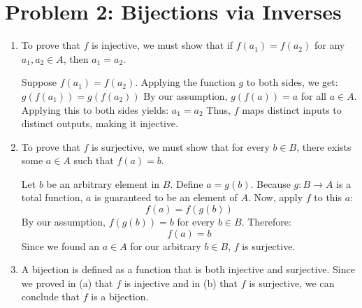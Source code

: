 \documentclass[11pt]{article}
\begin{document}
\section*{Problem 2: Bijections via Inverses}
\begin{enumerate}[label=\textbf{(\alph*)}]
    \item To prove that $f$ is injective, we must show that if $f(a_1) = f(a_2)$ for any $a_1, a_2 \in A$, then $a_1 = a_2$. 
    
    Suppose $f(a_1) = f(a_2)$. Applying the function $g$ to both sides, we get:
    $g(f(a_1)) = g(f(a_2))$
    By our assumption, $g(f(a)) = a$ for all $a \in A$. Applying this to both sides yields:
    $a_1 = a_2$
    Thus, $f$ maps distinct inputs to distinct outputs, making it injective.

    \item To prove that $f$ is surjective, we must show that for every $b \in B$, there exists some $a \in A$ such that $f(a) = b$. 
    
    Let $b$ be an arbitrary element in $B$. Define $a = g(b)$. Because $g: B \to A$ is a total function, $a$ is guaranteed to be an element of $A$. 
    Now, apply $f$ to this $a$:
    $$f(a) = f(g(b))$$
    By our assumption, $f(g(b)) = b$ for every $b \in B$. Therefore:
    $$f(a) = b$$
    Since we found an $a \in A$ for our arbitrary $b \in B$, $f$ is surjective.

    \item A bijection is defined as a function that is both injective and surjective. Since we proved in (a) that $f$ is injective and in (b) that $f$ is surjective, we can conclude that $f$ is a bijection.
\end{enumerate}

\vspace{0.5cm}
\end{document}
